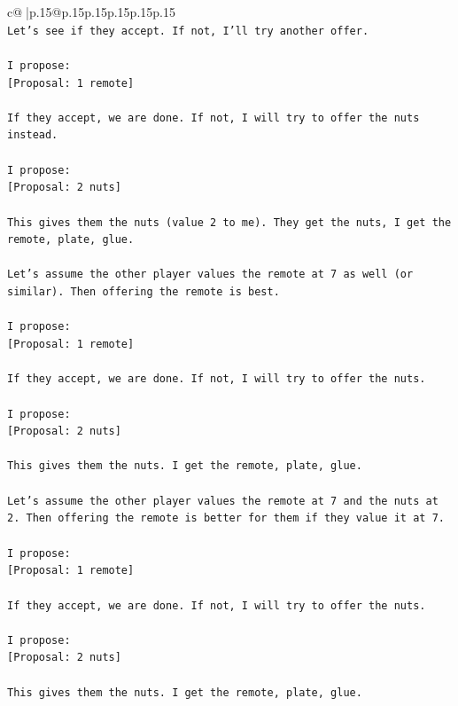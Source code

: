 \documentclass{article}
\begin{document}
{\begin{supertabular}{c@{$\;$}|p{.15\linewidth}@{}p{.15\linewidth}p{.15\linewidth}p{.15\linewidth}p{.15\linewidth}p{.15\linewidth}}
{{{\\ 
\texttt{Let's see if they accept. If not, I'll try another offer.} \\
\\ 
\texttt{I propose:} \\
\texttt{{[}Proposal: 1 remote{]}} \\
\\ 
\texttt{If they accept, we are done. If not, I will try to offer the nuts instead.} \\
\\ 
\texttt{I propose:} \\
\texttt{{[}Proposal: 2 nuts{]}} \\
\\ 
\texttt{This gives them the nuts (value 2 to me). They get the nuts, I get the remote, plate, glue.} \\
\\ 
\texttt{Let's assume the other player values the remote at 7 as well (or similar). Then offering the remote is best.} \\
\\ 
\texttt{I propose:} \\
\texttt{{[}Proposal: 1 remote{]}} \\
\\ 
\texttt{If they accept, we are done. If not, I will try to offer the nuts.} \\
\\ 
\texttt{I propose:} \\
\texttt{{[}Proposal: 2 nuts{]}} \\
\\ 
\texttt{This gives them the nuts. I get the remote, plate, glue.} \\
\\ 
\texttt{Let's assume the other player values the remote at 7 and the nuts at 2. Then offering the remote is better for them if they value it at 7.} \\
\\ 
\texttt{I propose:} \\
\texttt{{[}Proposal: 1 remote{]}} \\
\\ 
\texttt{If they accept, we are done. If not, I will try to offer the nuts.} \\
\\ 
\texttt{I propose:} \\
\texttt{{[}Proposal: 2 nuts{]}} \\
\\ 
\texttt{This gives them the nuts. I get the remote, plate, glue.} \\
}}}
\end{supertabular}}
\end{document}
